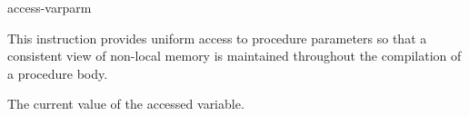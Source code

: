 \begin{instruction}{access-varparm}

  \begin{notes}
    This instruction provides uniform access to \byref procedure
    parameters so that a consistent view of non-local memory is
    maintained throughout the compilation of a procedure body.
  \end{notes}

  \begin{results}
  \item The current value of the accessed \byref variable.
  \end{results}

  \begin{operands}
  \item {}
  \item {}
  \item {}
  \end{operands}

  \begin{seealso}
  \end{seealso}
\end{instruction}

